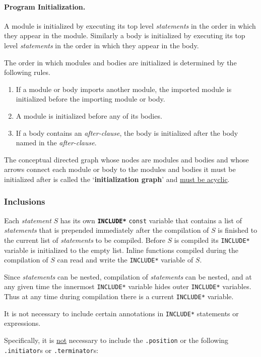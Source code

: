 \documentclass[12pt]{article}
\newcommand{\subsubsubsection}[1]{\paragraph[#1]{#1.}}
\newcommand{\key}[1]{{\rm \bfseries #1}}
\newcommand{\ttkey}[1]{{\tt \bfseries #1}}
\begin{document}
\subsubsubsection{Program Initialization}
\label{PROGRAM-INITIALIZATION}

A module is initialized by executing its top level {\em statements}
in the order in which they appear in the module.  Similarly
a body is initialized by executing its top level {\em statements}
in the order in which they appear in the body.

The order in which modules and bodies are initialized is determined
by the following rules.
\begin{enumerate}
\item If a module or body imports another module, the imported module
is initialized before the importing module or body.
\item A module is initialized before any of its bodies.
\item If a body contains an {\em after-clause}, the body
is initialized after the body named in the {\em after-clause}.
\end{enumerate}

The conceptual directed graph whose nodes are modules and bodies
and whose arrows connect each module or body to the modules and
bodies it must be initialized after is called
the `\key{initialization graph}'\label{INITIALIZATION-GRAPH}
and \underline{must be acyclic}.

\subsubsection{Inclusions}
\label{INCLUSIONS}

Each {\em statement} $S$ has its own \ttkey{*INCLUDE*} {\tt const} variable
that contains a list of {\em statements} that is prepended
immediately after the compilation of $S$ is finished
to the current list of {\em statements} to be compiled. 
Before $S$ is compiled its {\tt *INCLUDE*} variable is initialized
to the empty list.  Inline functions compiled during the compilation of $S$
can read and write the {\tt *INCLUDE*} variable of $S$.

Since {\em statements} can be nested, compilation of {\em statements}
can be nested, and at any given time the innermost {\tt *INCLUDE*}
variable hides outer {\tt *INCLUDE*} variables.  Thus at any time
during compilation there is a current {\tt *INCLUDE*} variable.

It is not necessary to include certain annotations
in {\tt *INCLUDE*} statements or expressions.

Specifically, it is \underline{not} necessary to
include the {\tt .position} or
the following {\tt .initiator}s or {\tt .terminator}s:
\end{document}
